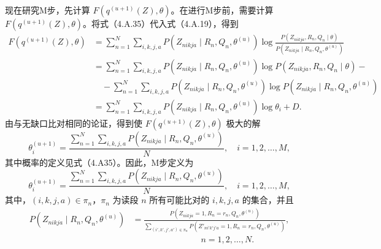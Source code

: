 现在研究M步，先计算 $F(q^{(u+1)}(Z),\theta)$。在进行M步前，需要计算 $F(q^{(u+1)}(Z),\theta)$。将式（4.A.35）代入式（4.A.19），得到
\begin{equation}
\begin{aligned}
F(q^{(u+1)}(Z),\theta)
&=\sum_{n=1}^{N}\sum_{i,k,j,a}P(Z_{nikja}\mid R_n,Q_n,\theta^{(u)})
 \log\frac{P(Z_{nikja},R_n,Q_n\mid\theta)}{P(Z_{nikja}\mid R_n,Q_n,\theta^{(u)})}\\
&=\sum_{n=1}^{N}\sum_{i,k,j,a}P(Z_{nikja}\mid R_n,Q_n,\theta^{(u)})
 \log P(Z_{nikja},R_n,Q_n\mid\theta)-{}\\
&\quad{}-\sum_{n=1}^{N}\sum_{i,k,j,a}P(Z_{nikja}\mid R_n,Q_n,\theta^{(u)})
 \log P(Z_{nikja}\mid R_n,Q_n,\theta^{(u)})\\
&=\sum_{n=1}^{N}\sum_{i,k,j,a}P(Z_{nikja}\mid R_n,Q_n,\theta^{(u)})\log\theta_i+D.
\end{aligned}\tag{4.A.36}
\end{equation}
由与无缺口比对相同的论证，得到使 $F(q^{(u+1)}(Z),\theta)$ 极大的解
\[
\theta_i^{(u+1)}=\frac{\sum_{n=1}^{N}\sum_{i,k,j,a}P(Z_{nikja}\mid R_n,Q_n,\theta^{(u)})}{N},
\quad i=1,2,\ldots,M,
\]
其中概率的定义见式（4.A35）。因此，M步定义为
\begin{equation}
\theta_i^{(u+1)}=\frac{\sum_{n=1}^{N}\sum_{i,k,j,a}P(Z_{nikja}\mid R_n,Q_n,\theta^{(u)})}{N},
\quad i=1,2,\ldots,M,\tag{4.A.37}
\end{equation}
其中，$(i,k,j,a)\in\pi_n$，$\pi_n$ 为读段 $n$ 所有可能比对的 $i,k,j,a$ 的集合，并且
\[
\begin{aligned}
P(Z_{nikja}\mid R_n,Q_n,\theta^{(u)})
&=\frac{P(Z_{nikja}=1,R_n=r_n,Q_n,\theta^{(u)})}{
\sum_{(i',k',j',a')\in\pi_n}P(Z'_{ni'k'j'a}=1,R_n=r_n,Q_n,\theta^{(u)})},\\
&\hspace{8em}n=1,2,\ldots,N.
\end{aligned}
\]
